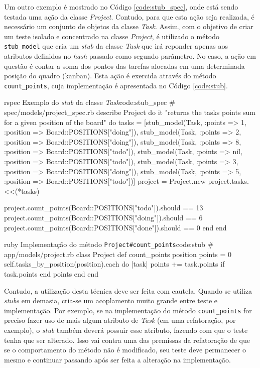 Um outro exemplo é mostrado no Código \ref{code:stub_spec}, onde está sendo testada uma ação da classe \textit{Project}. Contudo, para que esta ação seja realizada, é necessário um conjunto de objetos da classe \textit{Task}. Assim, com o objetivo de criar um teste isolado e concentrado na classe \textit{Project}, é utilizado o método \texttt{stub\_model} que cria um \textit{stub} da classe \textit{Task} que irá reponder apenas aos atributos definidos no \textit{hash} passado como segundo parâmetro. No caso, a ação em questão é contar a soma dos pontos das tarefas alocadas em uma determinada posição do quadro (kanban). Esta ação é exercida através do método \texttt{count\_points}, cuja implementação é apresentada no Código \ref{code:stub}.

\begin{mycode}{rspec}%
{Exemplo do \textit{stub} da classe \textit{Task}}{code:stub_spec}
# spec/models/project_spec.rb
describe Project do
  it "returns the tasks points sum for a given position of the board" do
    tasks = [stub_model(Task, :points => 1, :position => Board::POSITIONS["doing"]),
             stub_model(Task, :points => 2, :position => Board::POSITIONS["doing"]),
             stub_model(Task, :points => 8, :position => Board::POSITIONS["todo"]),
             stub_model(Task, :points => nil, :position => Board::POSITIONS["todo"]),
             stub_model(Task, :points => 3, :position => Board::POSITIONS["doing"]),
             stub_model(Task, :points => 5, :position => Board::POSITIONS["todo"])]
    project = Project.new
    project.tasks.<<(*tasks)

    project.count_points(Board::POSITIONS["todo"]).should == 13
    project.count_points(Board::POSITIONS["doing"]).should == 6
    project.count_points(Board::POSITIONS["done"]).should == 0
  end
end
\end{mycode}

\begin{mycode}{ruby}%
{Implementação do método \texttt{Project\#count\_points}}{code:stub}
# app/models/project.rb
class Project
  def count_points position
    points = 0
    self.tasks_by_position(position).each do |task|
      points += task.points if task.points
    end
    points
  end
end
\end{mycode}

Contudo, a utilização desta técnica deve ser feita com cautela. Quando se utiliza \textit{stubs} em demasia, cria-se um acoplamento muito grande entre teste e implementação. Por exemplo, se na implementação do método \texttt{count\_points} for preciso fazer uso de mais algum atributo de \textit{Task} (em uma refatoração, por exemplo), o \textit{stub} também deverá possuir esse atributo, fazendo com que o teste tenha que ser alterado. Isso vai contra uma das premissas da refatoração de que se o comportamento do método não é modificado, seu teste deve permanecer o mesmo e continuar passando após ser feita a alteração na implementação.

